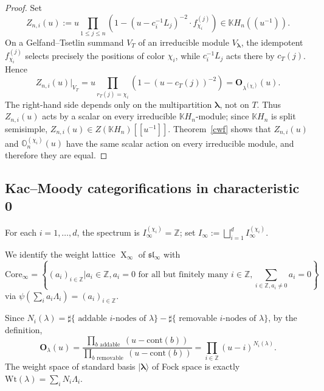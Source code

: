 \documentclass[12pt]{amsart}
\numberwithin{itemcounter}{subsection}
\theoremstyle{plain}
\theoremstyle{definition}
\theoremstyle{remark}
\numberwithin{equation}{section}
\def\bbK{\mathbb{K}}
\def\bbO{\mathbb{O}}
\def\bbZ{\mathbb{Z}}
\def\fraks{\mathfrak{s}}
\def\frakl{\mathfrak{l}}
\def\frakl{\mathfrak{l}}
\def\bfO{\mathbf{O}}
\def\X{\operatorname{X}\nolimits}
\newcommand*{\tuple}[1]
{\boldsymbol{#1}}
\begin{document}
									\begin{proof}

										Set
										\[
										Z_{n,i}(u):=u\prod\limits_{1\leq j\leq n}\left(1-(u-c_i^{-1}L_j)^{-2}\cdot f^{(j)}_{\chi_i}\right)\in \bbK H_n((u^{-1})).
										\]
										On a Gelfand--Tsetlin summand $V_T$ of an irreducible module $V_{\tuple\lambda}$, the idempotent $f^{(j)}_{\chi_i}$ selects precisely the positions of color $\chi_i$, while $c_i^{-1}L_j$ acts there by $c_T(j)$. Hence
										\[
										Z_{n,i}(u)|_{V_T}=u\prod_{r_T(j)=\chi_i}\left(1-(u-c_T(j))^{-2}\right)=\bfO_{\lambda^{(\chi_i)}}(u).
										\]
										The right-hand side depends only on the multipartition $\tuple\lambda$, not on $T$. Thus $Z_{n,i}(u)$ acts by a scalar on every irreducible $\bbK H_n$-module; since $\bbK H_n$ is split semisimple, $Z_{n,i}(u)\in Z(\bbK H_n)[[u^{-1}]]$. Theorem~\ref{cwf} shows that $Z_{n,i}(u)$ and $\bbO_n^{(\chi_i)}(u)$ have the same scalar action on every irreducible module, and therefore they are equal.

									\end{proof}

			\subsection{Kac--Moody categorifications in characteristic 0}\label{sub:wreath-KM-char0}
            For each $i=1,\ldots,d$, the spectrum is $I_\infty^{(\chi_i)}=\bbZ$; set $I_\infty:=\bigsqcup_{i=1}^{d}I_\infty^{(\chi_i)}.$

									We identify the weight lattice $\X_{\infty}$ of $\fraks\frakl_{\infty}$
									with
									$$\mathrm{Core}_{\infty}=\left\{(a_i)_{i\in \bbZ}| a_i\in \bbZ, a_i=0\,\, \text{for all but finitely many $i\in \bbZ$}, \sum_{i\in\bbZ,a_i\neq0}a_i=0\right\}$$ via
									$\psi(\sum_i a_i\Lambda_i)=(a_i)_{i\in \bbZ}.$

									Since $N_i(\lambda ) = \sharp\{ \text{ addable $i$-nodes of $\lambda$}\}
									- \sharp\{ \text{ removable $i$-nodes of $\lambda$} \}$, by the definition, $$\bfO_{\lambda}(u)=\frac{\prod\limits_{\text{$b$  addable }}(u-\text{cont}(b))}{\prod\limits_{\text{$b$  removable }}(u-\text{cont}(b))}=\prod_{i\in \bbZ}(u-i)^{N_i(\lambda)}.$$
									The weight space of standard basis
									$|\tuple\lambda\rangle
									$ of Fock space is exactly
									$\mathrm{Wt}(\lambda)=\sum_i N_i\Lambda_i.$
\end{document}
